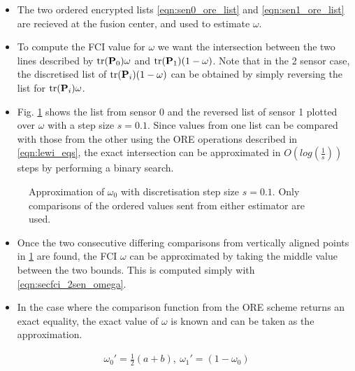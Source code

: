 \documentclass[letterpaper, 10 pt, conference]{ieeeconf}  %
\begin{document}
\begin{itemize}
   \item The two ordered encrypted lists \eqref{eqn:sen0_ore_list} and \eqref{eqn:sen1_ore_list} are recieved at the fusion center, and used to estimate $\omega$.
   \item To compute the FCI value for $\omega$ we want the intersection between the two lines described by $\operatorname{tr}({{\mathbf{P}}}_0)\omega$ and $\operatorname{tr}({{\mathbf{P}}}_1)(1-\omega)$. Note that in the 2 sensor case, the discretised list of $\operatorname{tr}({{\mathbf{P}}}_i)(1-\omega)$ can be obtained by simply reversing the list for $\operatorname{tr}({{\mathbf{P}}}_i)\omega$.
   \item Fig. \ref{fig:2_sensor_sol} shows the list from sensor 0 and the reversed list of sensor 1 plotted over $\omega$ with a step size $s=0.1$. Since values from one list can be compared with those from the other using the ORE operations described in \eqref{eqn:lewi_eqs}, the exact intersection can be approximated in $O(log(\frac{1}{s}))$ steps by performing a binary search.
\end{itemize}
\begin{figure}[tb]
   \begin{center}
      
   \end{center}
   \caption{Approximation of $\omega_0$ with discretisation step size $s=0.1$. Only comparisons of the ordered values sent from either estimator are used.}
   \label{fig:2_sensor_sol}
\end{figure}
\begin{itemize}
   \item Once the two consecutive differing comparisons from vertically aligned points in \ref{fig:2_sensor_sol} are found, the FCI $\omega$ can be approximated by taking the middle value between the two bounds. This is computed simply with \eqref{eqn:secfci_2sen_omega}.
   \item In the case where the comparison function from the ORE scheme returns an exact equality, the exact value of $\omega$ is known and can be taken as the approximation.
\end{itemize}
\begin{gather}
   \omega_0'=\frac{1}{2}(a + b),\ \omega_1' = (1-\omega_0) \label{eqn:secfci_2sen_omega}
\end{gather}
\end{document}
